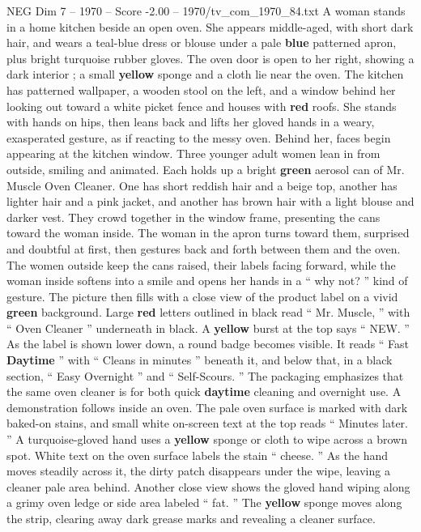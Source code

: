 \begin{textsample}{NEG Dim 7 – 1970 – Score -2.00 – 1970/tv\_com\_1970\_84.txt}  \label{ex:f7_neg_070}
A woman stands in a home kitchen beside an open oven.
She appears middle-aged, with short dark hair, and wears a teal-blue dress or blouse under a pale \textbf{blue} patterned apron, plus bright turquoise rubber gloves.
The oven door is open to her right, showing a dark interior ; a small \textbf{yellow} sponge and a cloth lie near the oven.
The kitchen has patterned wallpaper, a wooden stool on the left, and a window behind her looking out toward a white picket fence and houses with \textbf{red} roofs.
She stands with hands on hips, then leans back and lifts her gloved hands in a weary, exasperated gesture, as if reacting to the messy oven.
Behind her, faces begin appearing at the kitchen window.
Three younger adult women lean in from outside, smiling and animated.
Each holds up a bright \textbf{green} aerosol can of Mr.
Muscle Oven Cleaner.
One has short reddish hair and a beige top, another has lighter hair and a pink jacket, and another has brown hair with a light blouse and darker vest.
They crowd together in the window frame, presenting the cans toward the woman inside.
The woman in the apron turns toward them, surprised and doubtful at first, then gestures back and forth between them and the oven.
The women outside keep the cans raised, their labels facing forward, while the woman inside softens into a smile and opens her hands in a “ why not? ” kind of gesture.
The picture then fills with a close view of the product label on a vivid \textbf{green} background.
Large \textbf{red} letters outlined in black read “ Mr.
Muscle, ” with “ Oven Cleaner ” underneath in black.
A \textbf{yellow} burst at the top says “ NEW. ” As the label is shown lower down, a round badge becomes visible.
It reads “ Fast \textbf{Daytime} ” with “ Cleans in minutes ” beneath it, and below that, in a black section, “ Easy Overnight ” and “ Self-Scours. ” The packaging emphasizes that the same oven cleaner is for both quick \textbf{daytime} cleaning and overnight use.
A demonstration follows inside an oven.
The pale oven surface is marked with dark baked-on stains, and small white on-screen text at the top reads “ Minutes later. ” A turquoise-gloved hand uses a \textbf{yellow} sponge or cloth to wipe across a brown spot.
White text on the oven surface labels the stain “ cheese. ” As the hand moves steadily across it, the dirty patch disappears under the wipe, leaving a cleaner pale area behind.
Another close view shows the gloved hand wiping along a grimy oven ledge or side area labeled “ fat. ” The \textbf{yellow} sponge moves along the strip, clearing away dark grease marks and revealing a cleaner surface.

\end{textsample}
